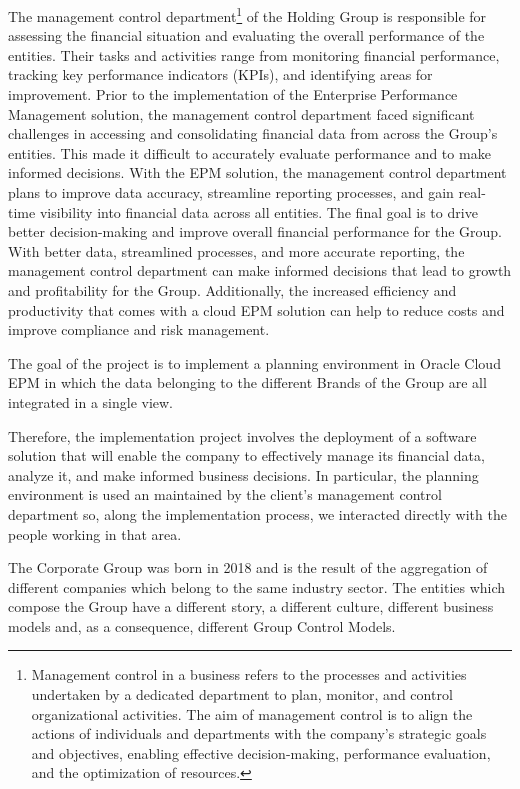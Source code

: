 \documentclass[12pt,a4paper,openright,twoside]{book}
\begin{document}
The management control department\footnote{Management control in a business refers to the processes and activities undertaken by a dedicated department to plan, monitor, and control organizational activities. The aim of management control is to align the actions of individuals and departments with the company's strategic goals and objectives, enabling effective decision-making, performance evaluation, and the optimization of resources.} of the Holding Group is responsible for assessing the financial situation and evaluating the overall performance of the entities.
%
Their tasks and activities range from monitoring financial performance, tracking key performance indicators (KPIs), and identifying areas for improvement.
%
Prior to the implementation of the Enterprise Performance Management solution, the management control department faced significant challenges in accessing and consolidating financial data from across the Group's entities.
%
This made it difficult to accurately evaluate performance and to make informed decisions.
%
With the EPM solution, the management control department plans to improve data accuracy, streamline reporting processes, and gain real-time visibility into financial data across all entities. 
%
The final goal is to drive better decision-making and improve overall financial performance for the Group.
%
With better data, streamlined processes, and more accurate reporting, the management control department can make informed decisions that lead to growth and profitability for the Group. 
%
Additionally, the increased efficiency and productivity that comes with a cloud EPM solution can help to reduce costs and improve compliance and risk management.

The goal of the project is to implement a planning environment in Oracle Cloud EPM in which the data belonging to the different Brands of the Group are all integrated in a single view.

Therefore, the implementation project involves the deployment of a software solution that will enable the company to effectively manage its financial data, analyze it, and make informed business decisions.
%
In particular, the planning environment is used an maintained by the client's management control department so, along the implementation process, we interacted directly with the people working in that area.

The Corporate Group was born in 2018 and is the result of the aggregation of different companies which belong to the same industry sector.
%
The entities which compose the Group have a different story, a different culture, different business models and, as a consequence, different Group Control Models.
\end{document}
